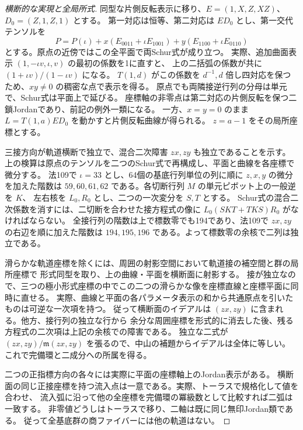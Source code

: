 \begin{proof}[横断的な実現と全局所式]
同型な片側反転表示に移り、$E=(1,X,Z,XZ)$、$D_0=(Z,1,Z,1)$ とする。
第一対応は恒等、第二対応は $ED_0$ とし、第一交代テンソルを
\[
 P=P(\iota)+x(E_{0011}+\iota E_{1001})+
                  y(E_{1100}+\iota E_{0110})
\]
とする。原点の近傍ではこの全平面で両Schur式が成り立つ。
実際、追加曲面表示 $(1,-\iota v,\iota,v)$ の最初の係数を1に直すと、
上の二括弧の係数が共に $(1+\iota v)/(1-\iota v)$ になる。
$T(1,d)$ がこの係数を $d^{-1},d$ 倍し四対応を保つため、$xy\ne0$ の稠密な点で表示を得る。
原点でも両隣接逆行列の分母は単元で、Schur式は平面上で延びる。
座標軸の非零点は第二対応の片側反転を保つ二鎖Jordanであり、前記の例外一類になる。
一方、$x=y=0$ のまま $L=T(1,a)ED_0$ を動かすと片側反転曲線が得られる。
$z=a-1$ をその局所座標とする。

三接方向が軌道横断で独立で、混合二次障害 $zx,zy$ も独立であることを示す。
上の検算は原点のテンソルを二つのSchur式で再構成し、平面と曲線を各座標で微分する。
法109で $\iota=33$ とし、64個の基底行列単位の列に順に $z,x,y$ の微分を加えた階数は
$59,60,61,62$ である。各切断行列 $M$ の単元ピボット上の一般逆を $K$、
左右核を $L_0,R_0$ とし、二つの一次変分を $S,T$ とする。
Schur式の混合二次係数を消すには、二切断を合わせた接方程式の像に
$L_0(SKT+TKS)R_0$ がなければならない。
全接行列の階数は上で標数零でも194であり、法109で $zx,zy$ の右辺を順に加えた階数は
$194,195,196$ である。よって標数零の余核で二列は独立である。

滑らかな軌道座標を除くには、周囲の射影空間において軌道接の補空間と群の局所座標で
形式同型を取り、上の曲線・平面を横断面に射影する。
接が独立なので、三つの極小形式座標の中でこの二つの滑らかな像を座標直線と座標平面に同時に直せる。
実際、曲線と平面の各パラメータ表示の和から共通原点を引いたものは可逆な一次項を持つ。
従って横断面のイデアルは $(zx,zy)$ に含まれる。他方、接行列の独立な行から
余分な周囲座標を形式的に消去した後、残る方程式の二次項は上記の余核での障害である。
独立な二式が $(zx,zy)/\mathfrak m(zx,zy)$ を張るので、中山の補題からイデアルは全体に等しい。
これで完備環と二成分への所属を得る。

二つの正指標方向の各々には実際に平面の座標軸上のJordan表示がある。
横断面の同じ正接座標を持つ流入点は一意である。実際、トーラスで規格化して値を合わせ、
流入弧に沿って他の全座標を完備環の冪級数として比較すれば二弧は一致する。
非零値どうしはトーラスで移り、二軸は既に同じ無印Jordan類である。
従って全基底群の商ファイバーには他の軌道はない。
\end{proof}
